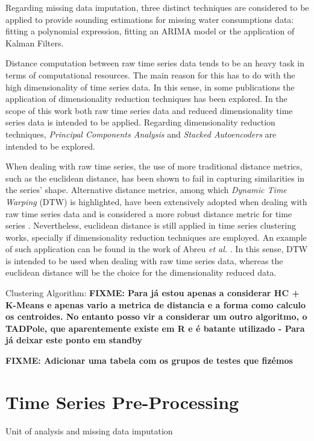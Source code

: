 \documentclass[9pt,journal,compsoc]{IEEEtran}
\begin{document}
Regarding missing data imputation, three distinct techniques are considered to be applied to provide sounding estimations for missing water consumptions data: fitting a polynomial expression, fitting an ARIMA model or the application of Kalman Filters.
	
Distance computation between raw time series data tends to be an heavy task in terms of computational resources. The main reason for this has to do with the high dimensionality of time series data. In this sense, in some publications the application of dimensionality reduction techniques has been explored. In the scope of this work both raw time series data and reduced dimensionality time series data is intended to be applied. Regarding dimensionality reduction techniques, \emph{Principal Components Analysis} and \emph{Stacked Autoencoders} are intended to be explored.
	
When dealing with raw time series, the use of more traditional distance metrics, such as the euclidean distance, has been shown to fail in capturing similarities in the series' shape. Alternative distance metrics, among which \emph{Dynamic Time Warping} (DTW) \cite{chu2002iterative} is highlighted, have been extensively adopted when dealing with raw time series data \cite{petitjean2014dynamic, izakian2015fuzzy} and is considered a more robust distance metric for time series \cite{wang2013experimental}. Nevertheless, euclidean distance is still applied in time series clustering works, specially if dimensionality reduction techniques are employed. An example of such application can be found in the work of Abreu \emph{et al.} \cite{abreu2012using}. In this sense, DTW is intended to be used when dealing with raw time series data, whereas the euclidean distance will be the choice for the dimensionality reduced data.
	
Clustering Algorithm: \textbf{FIXME: Para já estou apenas a considerar HC + K-Means e apenas vario a metrica de distancia e a forma como calculo os centroides. No entanto posso vir a considerar um outro algoritmo, o TADPole, que aparentemente existe em R e é batante utilizado - Para já deixar este ponto em standby}

\textbf{FIXME: Adicionar uma tabela com os grupos de testes que fizémos}


\section{Time Series Pre-Processing}

Unit of analysis and missing data imputation
\end{document}
